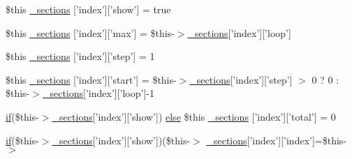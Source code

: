 \begin{DoxyCompactItemize}
\item 
\$this \hyperlink{media_234d6fa4bfd5eef6424a9ddc74a166350_2_06_06-19_05_06_06-1910644431_05basicindex_8tpl_8php_a29b37f249780f8e4baf79099f5530d56}{\-\_\-sections} \mbox{[}'index'\mbox{]}\mbox{[}'show'\mbox{]} = true
\item 
\$this \hyperlink{media_234d6fa4bfd5eef6424a9ddc74a166350_2_06_06-19_05_06_06-1910644431_05basicindex_8tpl_8php_a1ffc1a01b76c9534acee0093859896c4}{\-\_\-sections} \mbox{[}'index'\mbox{]}\mbox{[}'max'\mbox{]} = \$this-\/$>$\hyperlink{_06_06127_05_06_0612781687_05pkgelementindex_8tpl_8php_a9e3d26b39edfe29c3f29b8035ef33828}{\-\_\-sections}\mbox{[}'index'\mbox{]}\mbox{[}'loop'\mbox{]}
\item 
\$this \hyperlink{media_234d6fa4bfd5eef6424a9ddc74a166350_2_06_06-19_05_06_06-1910644431_05basicindex_8tpl_8php_acff296ad92d2af603afe8598b42de5ae}{\-\_\-sections} \mbox{[}'index'\mbox{]}\mbox{[}'step'\mbox{]} = 1
\item 
\$this \hyperlink{media_234d6fa4bfd5eef6424a9ddc74a166350_2_06_06-19_05_06_06-1910644431_05basicindex_8tpl_8php_a2f9452a85379234d14b435769aab3bfe}{\-\_\-sections} \mbox{[}'index'\mbox{]}\mbox{[}'start'\mbox{]} = \$this-\/$>$\hyperlink{_06_06127_05_06_0612781687_05pkgelementindex_8tpl_8php_a9e3d26b39edfe29c3f29b8035ef33828}{\-\_\-sections}\mbox{[}'index'\mbox{]}\mbox{[}'step'\mbox{]} $>$ 0 ? 0 \-: \$this-\/$>$\hyperlink{_06_06127_05_06_0612781687_05pkgelementindex_8tpl_8php_a9e3d26b39edfe29c3f29b8035ef33828}{\-\_\-sections}\mbox{[}'index'\mbox{]}\mbox{[}'loop'\mbox{]}-\/1
\item 
\hyperlink{_setup_8inc_8php_ad0184337b31d13763ec8751feff4aabe}{if}(\$this-\/$>$\hyperlink{_06_06127_05_06_0612781687_05pkgelementindex_8tpl_8php_a9e3d26b39edfe29c3f29b8035ef33828}{\-\_\-sections}\mbox{[}'index'\mbox{]}\mbox{[}'show'\mbox{]}) \*
\hyperlink{test__session_8php_a7ca5c3b9e4c46ab37c0418e95ddcfa36}{else} \$this \hyperlink{media_234d6fa4bfd5eef6424a9ddc74a166350_2_06_06-19_05_06_06-1910644431_05basicindex_8tpl_8php_aa7dfb1956b36dac3e2f02b82b6faa0dc}{\-\_\-sections} \mbox{[}'index'\mbox{]}\mbox{[}'total'\mbox{]} = 0
\item 
\hyperlink{_setup_8inc_8php_ad0184337b31d13763ec8751feff4aabe}{if}(\$this-\/$>$\hyperlink{_06_06127_05_06_0612781687_05pkgelementindex_8tpl_8php_a9e3d26b39edfe29c3f29b8035ef33828}{\-\_\-sections}\mbox{[}'index'\mbox{]}\mbox{[}'show'\mbox{]})(\$this-\/$>$\*
\hyperlink{_06_06127_05_06_0612781687_05pkgelementindex_8tpl_8php_a9e3d26b39edfe29c3f29b8035ef33828}{\-\_\-sections}\mbox{[}'index'\mbox{]}\mbox{[}'index'\mbox{]}=\$this-\/$>$\*

\end{DoxyCompactItemize}
